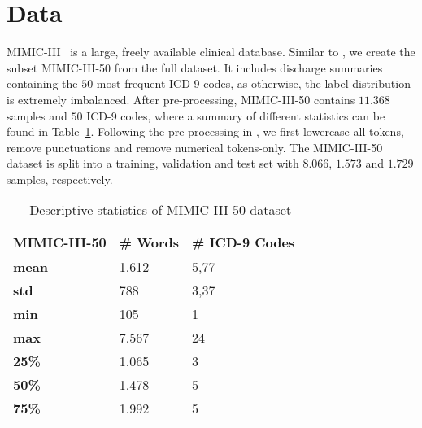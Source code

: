 \documentclass[11pt]{article}
\begin{document}
\section{Data}
MIMIC-III~\citep{johnson2016mimic} is a large, freely available clinical database. Similar to \citet{mullenbach-etal-2018-explainable}, we create the subset MIMIC-III-50 from the full dataset. It includes discharge summaries containing the $50$ most frequent ICD-9 codes, as otherwise, the label distribution is extremely imbalanced. 
After pre-processing, MIMIC-III-50 contains $11.368$ samples and $50$ ICD-9 codes, where a summary of different statistics can be found in Table~\ref{tab:descriptive_statistics_MIMIC_3_50}. 
Following the pre-processing in \citet{mullenbach-etal-2018-explainable}, we first lowercase all tokens, remove punctuations and remove numerical tokens-only.
The MIMIC-III-50 dataset is split into a training, validation and test set with $8.066$, $1.573$ and $1.729$ samples, respectively.
\begin{table}[t]
\centering
\begin{tabular}{llll}
\hline
\textbf{MIMIC-III-50} & \textbf{\# Words} & \textbf{\# ICD-9 Codes}\\
\hline
\textbf{mean} &  1.612  & 5,77\\
\textbf{std}  & 788 & 3,37\\
\textbf{min}  & 105 & 1\\
\textbf{max}  & 7.567 & 24 \\
\textbf{25\%}  & 1.065 & 3\\
\textbf{50\%}  & 1.478 & 5\\
\textbf{75\%}  & 1.992 & 5\\ \hline
\end{tabular}
\caption{Descriptive statistics of MIMIC-III-50 dataset}
\label{tab:descriptive_statistics_MIMIC_3_50}
\end{table}
\end{document}
